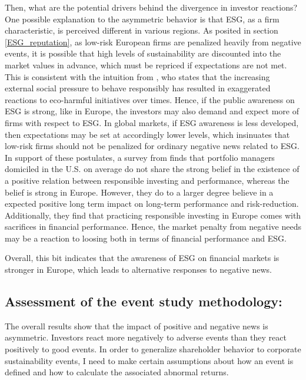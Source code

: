 Then, what are the potential drivers behind the divergence in investor reactions? One possible explanation to the asymmetric behavior is that ESG, as a firm characteristic, is perceived different in various regions. As posited in section \ref{ESG_reputation}, as low-risk European firms are penalized heavily from negative events, it is possible that high levels of sustainability are discounted into the market values in advance, which must be repriced if expectations are not met. This is consistent with the intuition from \cite{flammer2013corporate}, who states that the increasing external social pressure to behave responsibly has resulted in exaggerated reactions to eco-harmful initiatives over times. Hence, if the public awareness on ESG is strong, like in Europe, the investors may also demand and expect more of firms with respect to ESG. In global markets, if ESG awareness is less developed, then expectations may be set at accordingly lower levels, which insinuates that low-risk firms should not be penalized for ordinary negative news related to ESG.
In support of these postulates, a survey from \cite{van2016esg} finds that portfolio managers domiciled in the U.S. on average do not share the strong belief in the existence of a positive relation between responsible investing and performance, whereas the belief is strong in Europe. However, they do to a larger degree believe in a expected positive long term impact on long-term performance and risk-reduction. Additionally, they find that practicing responsible investing in Europe comes with sacrifices in financial performance. Hence, the market penalty from negative needs may be a reaction to loosing both in terms of financial performance and ESG. 

Overall, this bit indicates that the awareness of ESG on financial markets is stronger in Europe, which leads to alternative responses to negative news. 

\subsection{Assessment of the event study methodology:}

The overall results show that the impact of positive and negative news is asymmetric. Investors react more negatively to adverse events than they react positively to good events. In order to generalize shareholder behavior to corporate sustainability events, I need to make certain assumptions about how an event is defined and how to calculate the associated abnormal returns. 

